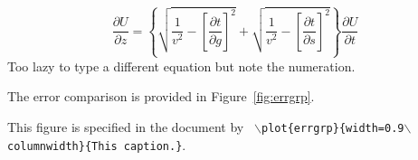 \documentclass[paper,twocolumn,twoside]{geophysics}
\begin{document}

\begin{equation}
\frac{\partial U}{\partial z} = 
\left\{
  \sqrt{\frac{1}{v^2} - \left[\frac{\partial t}{\partial g}\right]^2} +
  \sqrt{\frac{1}{v^2} - \left[\frac{\partial t}{\partial s}\right]^2}
\right\}
\frac{\partial U}{\partial t}
\label{eqn:partial2}
\end{equation}
Too lazy to type a different equation but note the numeration.

The error comparison is provided in Figure~\ref{fig:errgrp}.

{This figure is specified in the document by \texttt{
    $\backslash$plot\{errgrp\}\{width=0.9$\backslash$column\-width\}\{This caption.\}}.
}

\onecolumn





\twocolumn


\end{document}

